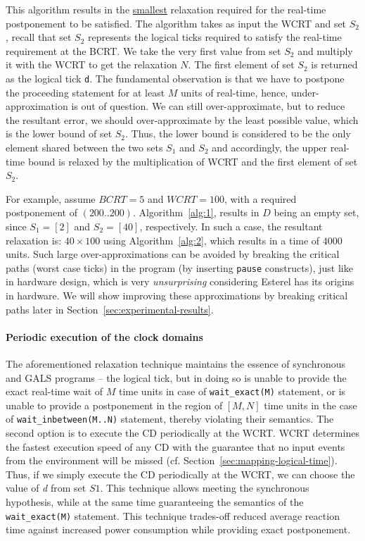 This algorithm results in the \underline{smallest} relaxation required
for the real-time postponement to be satisfied. The algorithm takes as
input the WCRT and set $S_2$, recall that set $S_2$ represents the
logical ticks required to satisfy the real-time requirement at the
BCRT. We take the very first value from set $S_2$ and multiply it with
the WCRT to get the relaxation $N$. The first element of set $S_2$ is
returned as the logical tick \texttt{d}. The fundamental observation is
that we have to postpone the proceeding statement for at least $M$ units
of real-time, hence, under-approximation is out of question. We can
still over-approximate, but to reduce the resultant error, we should
over-approximate by the least possible value, which is the lower bound
of set $S_2$. Thus, the lower bound is considered to be the only element
shared between the two sets $S_1$ and $S_2$ and accordingly, the upper
real-time bound is relaxed by the multiplication of WCRT and the first
element of set $S_2$.

For example, assume $BCRT=5$ and $WCRT=100$, with a required
postponement of $(200..200)$. Algorithm~\ref{alg:1}, results in $D$
being an empty set, since $S_1=[2]$ and $S_2=[40]$, respectively. In
such a case, the resultant relaxation is: $40 \times 100$ using
Algorithm~\ref{alg:2}, which results in a time of $4000$ units. Such
large over-approximations can be avoided by breaking the critical paths
(worst case ticks) in the program (by inserting \texttt{pause}
constructs), just like in hardware design, which is very
\textit{unsurprising} considering Esterel has its origins in hardware.
We will show improving these approximations by breaking critical paths
later in Section~\ref{sec:experimental-results}.


\paragraph{Periodic execution of the clock domains}
\label{sec:peri-exec-clock}

The aforementioned relaxation technique maintains the essence of
synchronous and GALS programs -- the logical tick, but in doing so is
unable to provide the exact real-time wait of $M$ time units in case of
\texttt{wait\_exact(M)} statement, or is unable to provide a
postponement in the region of $[M, N]$ time units in the case of
\texttt{wait\_inbe\-tween(M..N)} statement, thereby violating their
semantics. The second option is to execute the CD periodically at the
WCRT. WCRT determines the fastest execution speed of any CD with the
guarantee that no input events from the environment will be missed (cf.
Section~\ref{sec:mapping-logical-time}). Thus, if we simply execute the
CD periodically at the WCRT, we can choose the value of \textit{d} from
set $S1$. This technique allows meeting the synchronous hypothesis,
while at the same time guaranteeing the semantics of the
\texttt{wait\_exact(M)} statement. This technique trades-off reduced
average reaction time against increased power consumption while
providing exact postponement.

